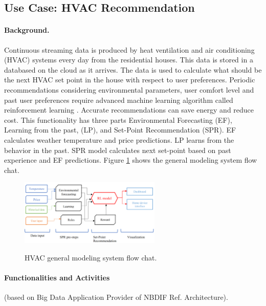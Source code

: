 \subsection{Use Case: HVAC Recommendation}


\paragraph*{Background.}

Continuous streaming data is produced by heat ventilation and air conditioning (HVAC) systems every
day from the residential houses. This data is stored in a databased on the cloud as it arrives. The data
is used to calculate what should be the next HVAC set point in the house with respect to user
preferences. Periodic recommendations considering environmental parameters, user comfort level
and past user preferences require advanced machine learning algorithm called reinforcement
learning . Accurate recommendations can save energy and reduce cost. This functionality has three
parts Environmental Forecasting (EF), Learning from the past, (LP), and Set-Point Recommendation
(SPR). EF calculates weather temperature and price predictions. LP learns from the behavior in the
past. SPR model calculates next set-point based on past experience and EF predictions. Figure \ref{fig:hvac-1} shows
the general modeling system flow chat.

\begin{figure}[htb]
\centering\includegraphics[width=0.6\textwidth]{usecase/hvac.png}
\label{fig:hvac-1}
\caption{HVAC general modeling system flow chat.}
\end{figure}


\paragraph*{Functionalities and Activities} (based on Big Data Application Provider of NBDIF Ref. Architecture).

